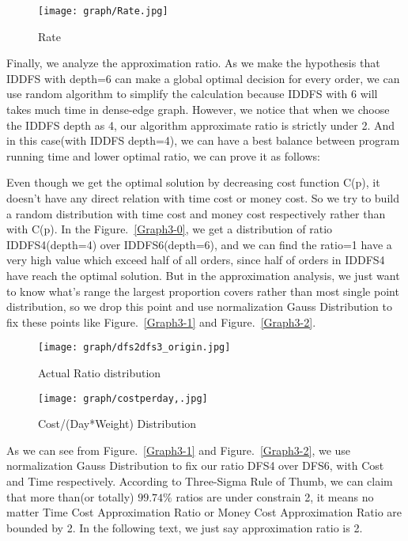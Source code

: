 \documentclass{llncs}
\begin{document}
\begin{figure}[htbp]
  \centering
  \texttt{[image: graph/Rate.jpg]}
  \caption{Rate}
  \label{fig:rt}
\end{figure}



Finally, we analyze the approximation ratio. As we make the hypothesis that IDDFS with depth=6 can make a global optimal decision for every order, we can use random algorithm to simplify the calculation because IDDFS with 6 will takes much time in dense-edge graph. However, we notice that when we choose the IDDFS depth as 4, our algorithm approximate ratio is strictly under 2. And in this case(with IDDFS depth=4), we can have a best balance between program running time and lower optimal ratio, we can prove it as follows:\par

Even though we get the optimal solution by decreasing cost function C(p), it doesn't have any direct relation with time cost or money cost. So we try to build a random distribution with time cost and money cost respectively rather than with C(p). In the Figure.~\ref{Graph3-0}, we get a distribution of ratio IDDFS4(depth=4) over IDDFS6(depth=6), and we can find the ratio=1 have a very high value which exceed half of all orders, since half of orders in IDDFS4 have reach the optimal solution. But in the approximation analysis, we just want to know what's range the largest proportion covers rather than most single point distribution, so we drop this point and use normalization Gauss Distribution to fix these points like Figure.~\ref{Graph3-1} and Figure.~\ref{Graph3-2}.

\begin{figure}[htbp]
\centering
\begin{minipage}[t]{0.48\textwidth}
\centering
\texttt{[image: graph/dfs2dfs3\_origin.jpg]}
\caption{Actual Ratio distribution}
\label{Graph3-0}
\end{minipage}
\begin{minipage}[t]{0.48\textwidth}
\centering
\texttt{[image: graph/costperday,.jpg]}
\caption{Cost/(Day*Weight) Distribution}
\label{Graph3-0-0}
\end{minipage}
\end{figure}

As we can see from Figure.~\ref{Graph3-1} and Figure.~\ref{Graph3-2}, we use normalization Gauss Distribution to fix our ratio DFS4 over DFS6, with Cost and Time respectively. According to Three-Sigma Rule of Thumb, we can claim that more than(or totally) $99.74\%$ ratios are under constrain 2, it means no matter Time Cost Approximation Ratio or Money Cost Approximation Ratio are bounded by 2. In the following text, we just say approximation ratio is 2.
\end{document}
